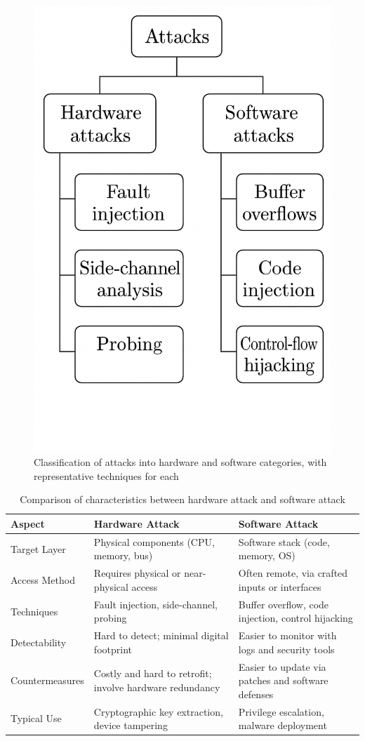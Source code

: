 \begin{figure}[t!]
  \centering
  \includegraphics[width=0.5\linewidth]{Chapitre1/figures/tree.png}
  \caption{Classification of attacks into hardware and software categories, with representative techniques for each}
  \label{tree}
\end{figure}

\begin{table}[htbp]
\caption{Comparison of characteristics between hardware attack and software attack}
\label{hw sw}
\centering
\begin{tabularx}{\textwidth}{lXX}
\toprule
Aspect          & Hardware Attack                                          & Software Attack                                    \\
\midrule
Target Layer    & Physical components (CPU, memory, bus)                   & Software stack (code, memory, OS)                  \\
Access Method   & Requires physical or near-physical access                & Often remote, via crafted inputs or interfaces     \\
Techniques      & Fault injection, side-channel, probing                   & Buffer overflow, code injection, control hijacking \\
Detectability   & Hard to detect; minimal digital footprint                & Easier to monitor with logs and security tools     \\
Countermeasures & Costly and hard to retrofit; involve hardware redundancy & Easier to update via patches and software defenses \\
Typical Use     & Cryptographic key extraction, device tampering           & Privilege escalation, malware deployment           \\
\bottomrule
\end{tabularx}
\end{table}

